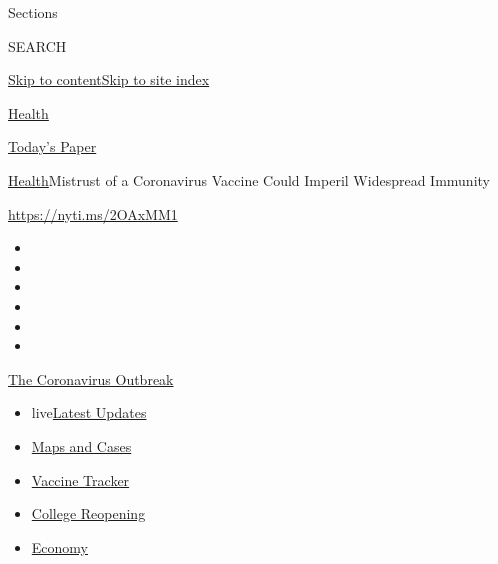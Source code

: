 Sections

SEARCH

\protect\hyperlink{site-content}{Skip to
content}\protect\hyperlink{site-index}{Skip to site index}

\href{https://www.nytimes.com/section/health}{Health}

\href{https://myaccount.nytimes.com/auth/login?response_type=cookie\&client_id=vi}{}

\href{https://www.nytimes.com/section/todayspaper}{Today's Paper}

\href{/section/health}{Health}\textbar{}Mistrust of a Coronavirus
Vaccine Could Imperil Widespread Immunity

\url{https://nyti.ms/2OAxMM1}

\begin{itemize}
\item
\item
\item
\item
\item
\item
\end{itemize}

\href{https://www.nytimes.com/news-event/coronavirus?action=click\&pgtype=Article\&state=default\&region=TOP_BANNER\&context=storylines_menu}{The
Coronavirus Outbreak}

\begin{itemize}
\tightlist
\item
  live\href{https://www.nytimes.com/2020/08/03/world/coronavirus-covid-19.html?action=click\&pgtype=Article\&state=default\&region=TOP_BANNER\&context=storylines_menu}{Latest
  Updates}
\item
  \href{https://www.nytimes.com/interactive/2020/us/coronavirus-us-cases.html?action=click\&pgtype=Article\&state=default\&region=TOP_BANNER\&context=storylines_menu}{Maps
  and Cases}
\item
  \href{https://www.nytimes.com/interactive/2020/science/coronavirus-vaccine-tracker.html?action=click\&pgtype=Article\&state=default\&region=TOP_BANNER\&context=storylines_menu}{Vaccine
  Tracker}
\item
  \href{https://www.nytimes.com/2020/08/02/us/covid-college-reopening.html?action=click\&pgtype=Article\&state=default\&region=TOP_BANNER\&context=storylines_menu}{College
  Reopening}
\item
  \href{https://www.nytimes.com/live/2020/08/03/business/stock-market-today-coronavirus?action=click\&pgtype=Article\&state=default\&region=TOP_BANNER\&context=storylines_menu}{Economy}
\end{itemize}

